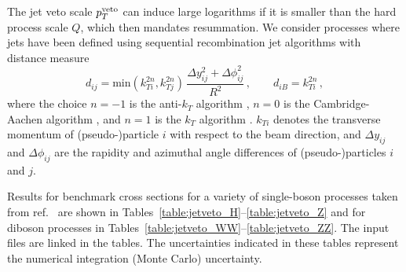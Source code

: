 \newpage

\label{jetvetosec}
The jet veto scale $p_T^{{\rm veto}}$ can induce large logarithms
if it is smaller than the hard process scale $Q$, which then mandates
resummation.
We consider processes where jets have been defined using
sequential recombination jet algorithms \cite{Salam:2010nqg} with distance measure
\begin{equation}\label{jetdef}
        d_{ij} = \mbox{min}(k_{Ti}^{2n},k_{Tj}^{2n})\,
        \frac{\Delta y_{ij}^2+\Delta\phi_{ij}^2}{R^2} \,, \qquad
        d_{iB} = k_{Ti}^{2n} \,,
\end{equation}
where the choice $n=-1$ is the anti-$k_T$ algorithm \cite{Cacciari:2008gp},
$n=0$ is the Cambridge-Aachen algorithm \cite{Dokshitzer:1997in,Wobisch:1998wt},
and $n=1$ is the $k_T$ algorithm \cite{Catani:1993hr,Ellis:1993tq}.
$k_{Ti}$ denotes the transverse momentum of (pseudo-)particle $i$ with respect to the beam
direction,
and $\Delta y_{ij}$ and $\Delta\phi_{ij}$ are the rapidity and azimuthal angle differences of
(pseudo-)particles $i$ and $j$.

Results for benchmark cross sections for a variety of single-boson processes
taken from ref.~\cite{CENS} are shown in  Tables~\ref{table:jetveto_H}--\ref{table:jetveto_Z}
and for diboson processes in
Tables~\ref{table:jetveto_WW}--\ref{table:jetveto_ZZ}.
The input files are linked in the tables.
The uncertainties indicated in these tables
represent the numerical integration (Monte Carlo) uncertainty.







